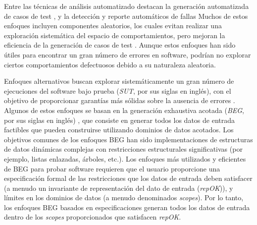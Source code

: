 Entre las técnicas de análisis automatizado destacan la generación automatizada de casos de test \cite{Ponzio:2016, Rosner15, Abad13, Galeotti:2010, Khalek:2011, Pasareanu:2010, Gligoric10, Tillmann:2008, Pacheco07}, y la detección y reporte automáticos de fallas \cite{Pacheco07, Ma15 , Godefroid05, Marinov01, Boyapati02, Godefroid12}
Muchos de estos enfoques incluyen componentes aleatorios, los cuales evitan realizar una exploración sistemática del espacio de comportamientos, pero mejoran la eficiencia de la generación de casos de test \cite{Pacheco07, Ma15, Fraser11}. Aunque estos enfoques han sido útiles para encontrar un gran número de errores en software, podrían no explorar ciertos comportamientos defectuosos debido a su naturaleza aleatoria.

Enfoques alternativos buscan explorar sistemáticamente un gran número de ejecuciones del software bajo prueba (\emph{SUT}, por sus siglas en inglés), con el objetivo de proporcionar garantías más sólidas sobre la ausencia de errores \cite{Marinov01, Boyapati02, Godefroid05, Godefroid18, Cadar08, Luckow14}. Algunos de estos enfoques se basan en la generación exhaustiva acotada (\emph{BEG}, por sus siglas en inglés) \cite{Marinov01, Boyapati02}, que consiste en generar todos los datos de entrada factibles que pueden construirse utilizando dominios de datos acotados. Los objetivos comunes de los enfoques BEG han sido implementaciones de estructuras de datos dinámicas complejas con restricciones estructurales significativas (por ejemplo, listas enlazadas, árboles, etc.). Los enfoques más utilizados y eficientes de BEG para probar software \cite{Marinov01, Boyapati02} requieren que el usuario proporcione una especificación formal de las restricciones que los datos de entrada deben satisfacer (a menudo un invariante de representación del dato de entrada (\textit{repOK})), y límites en los dominios de datos \cite{Marinov01, Boyapati02} (a menudo denominados \textit{scopes}). Por lo tanto, los enfoques BEG basados en especificaciones generan todos los datos de entrada dentro de los \textit{scopes} proporcionados que satisfacen \textit{repOK}.



